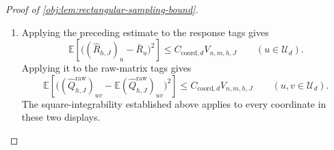 \documentclass[11pt]{article}
\begin{document}
\begin{proof}[Proof of \cref{obj:lem:rectangular-sampling-bound}]
\begin{enumerate}
By the definition of \(C_{\mathrm{ker},d}\),
\[
M_d^4D_d^2\le C_{\mathrm{ker},d},
\qquad
M_d^4\le C_{\mathrm{ker},d}.
\]
The slice and kernel bounds thus give
\[
\begin{aligned}
\mathbb E(\widehat H_\diamond-\mu_\diamond)^2
&\le \frac{5C_{\mathrm{ker},d}}{nh^d}
     +\frac{6C_{\mathrm{ker},d}k}{nNh^{2d}}\\
&\le6C_{\mathrm{ker},d}V_{n,m,h,J}.
\end{aligned}
\]
The independent-sample mean identity also gives
\[
\mathbb E\widehat S_\diamond
=\mathbb E\!\left[w_h(X^L)f_{\diamond,0}(Z)\right],
\qquad
\mathbb E\widehat H_\diamond=\mu_\diamond,
\]
and
\[
\begin{aligned}
\mathbb E(\widehat S_\diamond-\mathbb E\widehat S_\diamond)^2
&=\frac1\ell
 \left\{
 \mathbb E\!\left[
   \bigl(w_h(X^L)f_{\diamond,0}(Z)\bigr)^2
 \right]
 -\left(\mathbb E[w_h(X^L)f_{\diamond,0}(Z)]\right)^2
 \right\}\\
&\le\frac{3M_d^2}{nh^d}.
\end{aligned}
\]
Linearity of expectation gives the centered-difference identity
\[
F_\diamond-\mathbb EF_\diamond
=(\widehat S_\diamond-\mathbb E\widehat S_\diamond)
 -(\widehat H_\diamond-\mu_\diamond).
\]
The pointwise inequality
\[
(\xi_{\mathrm{diff}}-\zeta_{\mathrm{diff}})^2
\le2\xi_{\mathrm{diff}}^2+2\zeta_{\mathrm{diff}}^2
\qquad(\xi_{\mathrm{diff}},\zeta_{\mathrm{diff}}\in\mathbb R)
\]
follows from \((\xi_{\mathrm{diff}}+\zeta_{\mathrm{diff}})^2\ge0\). Applying it to the centered difference yields
\[
\begin{aligned}
\mathbb E(F_\diamond-\mathbb EF_\diamond)^2
&\le\frac{6M_d^2}{nh^d}
  +12C_{\mathrm{ker},d}V_{n,m,h,J}\\
&\le C_{\mathrm{coord},d}V_{n,m,h,J},
\end{aligned}
\]
because \(1/(nh^d)\le V_{n,m,h,J}\). This argument accommodates the shared outcome records in the two terms.

\item Applying the preceding estimate to the response tags gives
\[
\mathbb E\left[
 \bigl((\widehat R_{h,J})_u-\bar R_u\bigr)^2
 \right]
\le C_{\mathrm{coord},d}V_{n,m,h,J}
\qquad(u\in\mathcal U_d).
\]
Applying it to the raw-matrix tags gives
\[
\mathbb E\left[
 \bigl((\widehat Q^{\mathrm{raw}}_{h,J})_{uv}
       -\mathbb E(\widehat Q^{\mathrm{raw}}_{h,J})_{uv}\bigr)^2
 \right]
\le C_{\mathrm{coord},d}V_{n,m,h,J}
\qquad(u,v\in\mathcal U_d).
\]
The square-integrability established above applies to every coordinate in these two displays.


\end{enumerate}
\end{proof}
\end{document}

